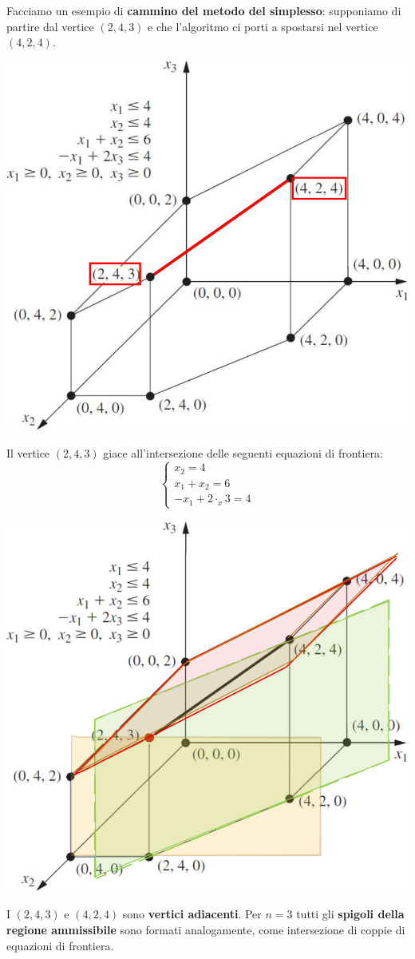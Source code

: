 \documentclass[12pt]{article}
\begin{document}
Facciamo un esempio di \textbf{cammino del metodo del simplesso}: supponiamo di partire dal vertice $(2, 4, 3)$ e che l'algoritmo
ci porti a spostarsi nel vertice $(4, 2, 4)$.
\begin{center}
    \includegraphics[width = 0.60\linewidth]{Images/40.png}
\end{center}
\noindent Il vertice $(2, 4, 3)$ giace all'intersezione delle seguenti equazioni di frontiera:
\begin{equation*}
    \begin{cases}
        x_2 = 4 \\
        x_1 + x_2 = 6 \\
        -x_1 + 2 \cdot_x3 = 4
    \end{cases}
\end{equation*}
\begin{center}
    \includegraphics[width = 0.60\linewidth]{Images/41.png}
\end{center}
\noindent I $(2, 4, 3)$ e $(4, 2, 4)$ sono \textbf{vertici adiacenti}. Per $n=3$ tutti gli \textbf{spigoli della regione ammissibile} sono formati analogamente,
come intersezione di coppie di equazioni di frontiera.
\end{document}
